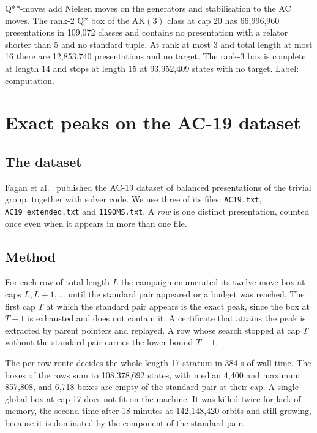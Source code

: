 \documentclass[11pt,a4paper]{article}
\theoremstyle{definition}
\newcommand{\AK}{\mathrm{AK}}
\begin{document}
Q**-moves add Nielsen moves on the generators and stabilisation to the AC moves. The rank-2 Q* box of the $\AK(3)$ class at cap 20 has 66,996,960 presentations in 109,072 classes and contains no presentation with a relator shorter than 5 and no standard tuple. At rank at most 3 and total length at most 16 there are 12,853,740 presentations and no target. The rank-3 box is complete at length 14 and stops at length 15 at 93,952,409 states with no target. Label: computation.

\section{Exact peaks on the AC-19 dataset}\label{sec:ac19}

\subsection{The dataset}

Fagan et al.\ \cite{FTS26} published the AC-19 dataset of balanced presentations of the trivial group, together with solver code. We use three of its files: \texttt{AC19.txt}, \texttt{AC19\_extended.txt} and \texttt{1190MS.txt}. A \emph{row} is one distinct presentation, counted once even when it appears in more than one file.

\subsection{Method}

For each row of total length $L$ the campaign enumerated its twelve-move box at caps $L, L+1, \dots$ until the standard pair appeared or a budget was reached. The first cap $T$ at which the standard pair appears is the exact peak, since the box at $T-1$ is exhausted and does not contain it. A certificate that attains the peak is extracted by parent pointers and replayed. A row whose search stopped at cap $T$ without the standard pair carries the lower bound $T+1$.

The per-row route decides the whole length-17 stratum in 384 s of wall time. The boxes of the rows sum to 108,378,692 states, with median 4,400 and maximum 857,808, and 6,718 boxes are empty of the standard pair at their cap. A single global box at cap 17 does not fit on the machine. It was killed twice for lack of memory, the second time after 18 minutes at 142,148,420 orbits and still growing, because it is dominated by the component of the standard pair.
\end{document}
